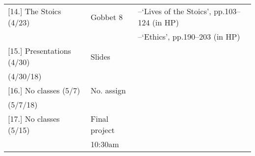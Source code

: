 \documentclass[article,oneside]{memoir}
\begin{document}
\begin{center}
\begin{longtable}{p{4.5cm}p{2cm}p{6cm}}
[14.] The Stoics	(4/23)			  	& Gobbet 8		&--`Lives of the Stoics', pp.103--124 (in HP) \\ 
			    				  	&		      		& --`Ethics', pp.190--203 (in HP) \\[1.8\baselineskip]

[15.] Presentations (4/30)				& Slides 			& \\ 
(4/30/18)				 		     	&			       	& \\ [1.8\baselineskip]

[16.] No classes (5/7)		    		& No. assign			& \\ 
(5/7/18)				    		  	& 			     	& \\ [1.8\baselineskip]

[17.] No classes (5/15)			    	& Final project		& \\ 
				      				&  10:30am    		& \\

\end{longtable}
\end{center}



\end{document}

